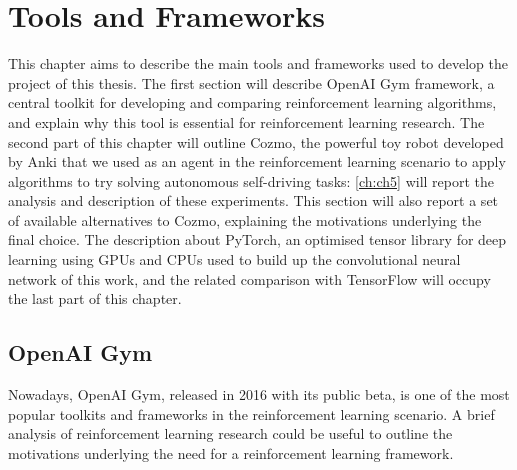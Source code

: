 
\chapter{Tools and Frameworks} \label{ch:ch3}

This chapter aims to describe the main tools and frameworks used to develop the project of this thesis. The first section will describe OpenAI Gym framework, a central toolkit for developing and comparing reinforcement learning algorithms, and explain why this tool is essential for reinforcement learning research.
The second part of this chapter will outline Cozmo, the powerful toy robot developed by Anki that we used as an agent in the reinforcement learning scenario to apply algorithms to try solving autonomous self-driving tasks: \vref{ch:ch5} will report the analysis and description of these experiments. This section will also report a set of available alternatives to Cozmo, explaining the motivations underlying the final choice.
The description about PyTorch, an optimised tensor library for deep learning using GPUs and CPUs used to build up the convolutional neural network of this work, and the related comparison with TensorFlow will occupy the last part of this chapter.

\section{OpenAI Gym}

Nowadays, OpenAI Gym, released in 2016 with its public beta, is one of the most popular toolkits and frameworks in the reinforcement learning scenario. A brief analysis of reinforcement learning research could be useful to outline the motivations underlying the need for a reinforcement learning framework.

